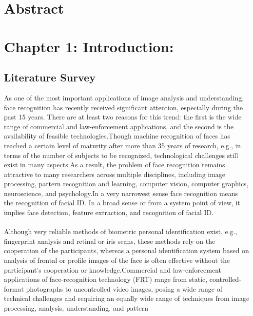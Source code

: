 \documentclass[12pt,a4paper]{book}
\begin{document}
\renewcommand\bibname{References} %

\section{Abstract}

\section{Chapter 1: Introduction:}

	\subsection{Literature Survey}
		As one of the most important applications of image analysis and understanding,
face recognition has recently received significant attention, especially during the
past 15 years. There are at least two reasons for this trend: the first is the wide range
of commercial and law-enforcement applications, and the second is the availability
of feasible technologies.Though machine recognition of faces has reached a certain level of maturity
after more than 35 years of research, e.g., in terms of the number of subjects to
be recognized, technological challenges still exist in many aspects.As a
result, the problem of face recognition remains attractive to many researchers
across multiple disciplines, including image processing, pattern recognition and
learning, computer vision, computer graphics, neuroscience, and psychology.In a very narrowest sense face recognition means the recognition of facial ID. In a broad sense or from a system
point of view, it implies face detection, feature extraction, and recognition of
facial ID.\\ \\
Although very reliable methods of biometric personal identification exist, e.g.,
fingerprint analysis and retinal or iris scans, these methods rely on the cooperation
of the participants, whereas a personal identification system based on analysis of
frontal or profile images of the face is often effective without the participant’s
cooperation or knowledge.Commercial and law-enforcement applications of face-recognition technology
(FRT) range from static, controlled-format photographs to uncontrolled video
images, posing a wide range of technical challenges and requiring an equally wide
range of techniques from image processing, analysis, understanding, and pattern
\end{document}
